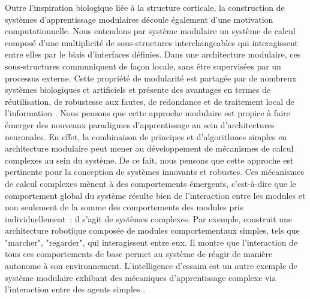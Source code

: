 Outre l'inspiration biologique liée à la structure corticale, la construction de systèmes d'apprentissage modulaires découle également d'une motivation computationnelle.
Nous entendons par système modulaire un système de calcul composé d'une multiplicité de sous-structures interchangeables qui interagissent entre elles par le biais d'interfaces définies. 
Dans une architecture modulaire, ces sous-structures communiquent de façon locale, sans être supervisées par un processus externe. Cette propriété de modularité est partagée par de nombreux systèmes biologiques et artificiels et présente des avantages en termes de réutilisation, de robustesse aux fautes, de redondance et de traitement local de l'information \parencite{clune_evolutionary_2013}.
Nous pensons que cette approche modulaire est propice à faire émerger des nouveaux paradigmes d'apprentissage au sein d'architectures neuronales. 
En effet, la combinaison de principes et d'algorithmes simples en architecture modulaire peut mener au développement de mécanismes de calcul complexes au sein du système. De ce fait, nous pensons que cette approche est pertinente pour la conception de systèmes innovants et robustes.
Ces mécanismes de calcul complexes mènent à des comportements émergents, c'est-à-dire que le comportement global du système résulte bien de l'interaction entre les modules et non seulement de la somme des comportements des modules pris individuellement~: il s'agit de systèmes complexes. 
Par exemple, \cite{brooks_sumsumption_85} construit une architecture robotique composée de modules comportementaux simples, tels que "marcher", "regarder", qui interagissent entre eux. Il montre que l'interaction de tous ces comportements de base permet au système de réagir de manière autonome à son environnement. L'intelligence d'essaim est un autre exemple de système modulaire exhibant des mécaniques d'apprentissage complexe via l'interaction entre des agents simples \parencite{Bonabeau1999SwarmI}.

